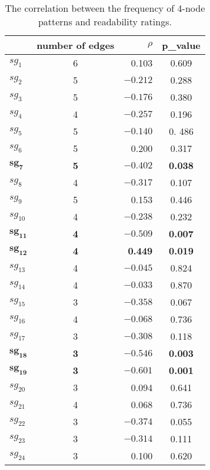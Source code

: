 \begin{table}[!t]
\centering
\begin{small}
\begin{tabular}{lcrc}
\hline
   & number of edges & $\rho$ & p\_value\\\hline
$sg_1$ & 6 & 0.103 & 0.609   \\
$sg_2$ & 5 & $-0.212$ & 0.288    \\
$sg_3$  & 5 &   $-0.176$ & 0.380      \\
$sg_4$  & 4 &$-0.257$ & 0.196    \\
$sg_5$ & 5 &$-0.140$ & 0. 486   \\
$sg_6$  & 5 &   0.200 &  0.317  \\
$\mathbf{sg_7}$ & \textbf{5} & $\mathbf{-0.402}$ & \textbf{0.038}  \\
$sg_8$  & 4 &$-0.317$ & 0.107 \\
$sg_9$ & 5 & 0.153 & 0.446   \\
$sg_{10}$ & 4 & $-0.238$ & 0.232    \\
$\mathbf{sg_{11}}$ & \textbf{4} & $\mathbf{-0.509}$     & \textbf{0.007}\\
$\mathbf{sg_{12}}$  & \textbf{4} &\textbf{0.449} & \textbf{0.019}    \\
$sg_{13}$  & 4 & $-0.045$ & 0.824    \\
$sg_{14}$ & 4 & $-0.033$ & 0.870\\
$sg_{15}$ & 3 &$-0.358$ & 0.067    \\
$sg_{16}$ &     4 &$-0.068$ & 0.736    \\
$sg_{17}$  & 3 & $-0.308$ & 0.118    \\
$\mathbf{sg_{18}}$ & \textbf{3} & $\mathbf{-0.546}$      & \textbf{0.003}   \\
$\mathbf{sg_{19}}$ & \textbf{3} & $\mathbf{-0.601}$ & \textbf{0.001}   \\
$sg_{20}$ & 3 & 0.094   & 0.641 \\
$sg_{21}$  & 4 & 0.068 & 0.736   \\
$sg_{22}$ &  3& $-0.374$ &  0.055  \\
$sg_{23}$ &     3&$-0.314$ & 0.111 \\
$sg_{24}$ &     3& 0.100 & 0.620  \\
\hline
\end{tabular}
\end{small}
\caption{The correlation between the frequency of 4-node patterns and readability ratings.}\label{table:correlation_4node_subgraph}
\end{table}


